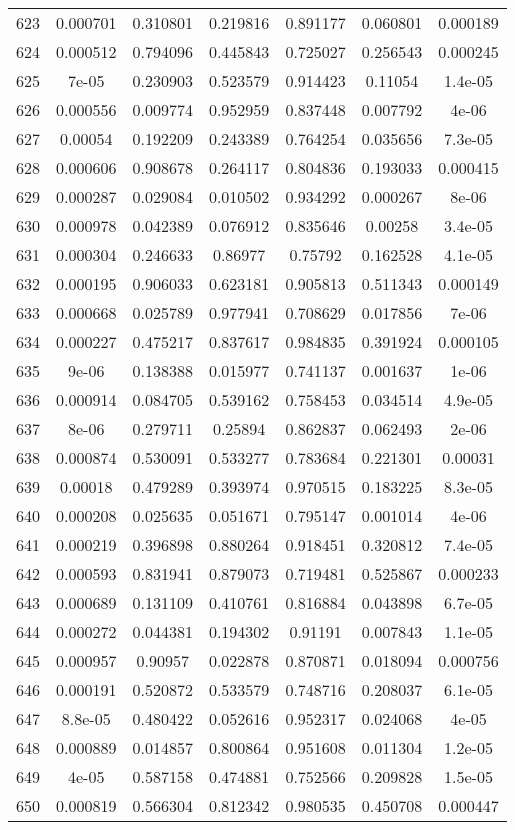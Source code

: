 \begin{table}
\begin{tabular}{c|c|c|c|c|c|c}
623 & 0.000701 & 0.310801 & 0.219816 & 0.891177 & 0.060801 & 0.000189\\
624 & 0.000512 & 0.794096 & 0.445843 & 0.725027 & 0.256543 & 0.000245\\
625 & 7e-05 & 0.230903 & 0.523579 & 0.914423 & 0.11054 & 1.4e-05\\
626 & 0.000556 & 0.009774 & 0.952959 & 0.837448 & 0.007792 & 4e-06\\
627 & 0.00054 & 0.192209 & 0.243389 & 0.764254 & 0.035656 & 7.3e-05\\
628 & 0.000606 & 0.908678 & 0.264117 & 0.804836 & 0.193033 & 0.000415\\
629 & 0.000287 & 0.029084 & 0.010502 & 0.934292 & 0.000267 & 8e-06\\
630 & 0.000978 & 0.042389 & 0.076912 & 0.835646 & 0.00258 & 3.4e-05\\
631 & 0.000304 & 0.246633 & 0.86977 & 0.75792 & 0.162528 & 4.1e-05\\
632 & 0.000195 & 0.906033 & 0.623181 & 0.905813 & 0.511343 & 0.000149\\
633 & 0.000668 & 0.025789 & 0.977941 & 0.708629 & 0.017856 & 7e-06\\
634 & 0.000227 & 0.475217 & 0.837617 & 0.984835 & 0.391924 & 0.000105\\
635 & 9e-06 & 0.138388 & 0.015977 & 0.741137 & 0.001637 & 1e-06\\
636 & 0.000914 & 0.084705 & 0.539162 & 0.758453 & 0.034514 & 4.9e-05\\
637 & 8e-06 & 0.279711 & 0.25894 & 0.862837 & 0.062493 & 2e-06\\
638 & 0.000874 & 0.530091 & 0.533277 & 0.783684 & 0.221301 & 0.00031\\
639 & 0.00018 & 0.479289 & 0.393974 & 0.970515 & 0.183225 & 8.3e-05\\
640 & 0.000208 & 0.025635 & 0.051671 & 0.795147 & 0.001014 & 4e-06\\
641 & 0.000219 & 0.396898 & 0.880264 & 0.918451 & 0.320812 & 7.4e-05\\
642 & 0.000593 & 0.831941 & 0.879073 & 0.719481 & 0.525867 & 0.000233\\
643 & 0.000689 & 0.131109 & 0.410761 & 0.816884 & 0.043898 & 6.7e-05\\
644 & 0.000272 & 0.044381 & 0.194302 & 0.91191 & 0.007843 & 1.1e-05\\
645 & 0.000957 & 0.90957 & 0.022878 & 0.870871 & 0.018094 & 0.000756\\
646 & 0.000191 & 0.520872 & 0.533579 & 0.748716 & 0.208037 & 6.1e-05\\
647 & 8.8e-05 & 0.480422 & 0.052616 & 0.952317 & 0.024068 & 4e-05\\
648 & 0.000889 & 0.014857 & 0.800864 & 0.951608 & 0.011304 & 1.2e-05\\
649 & 4e-05 & 0.587158 & 0.474881 & 0.752566 & 0.209828 & 1.5e-05\\
650 & 0.000819 & 0.566304 & 0.812342 & 0.980535 & 0.450708 & 0.000447\\
\end{tabular}
\end{table}
